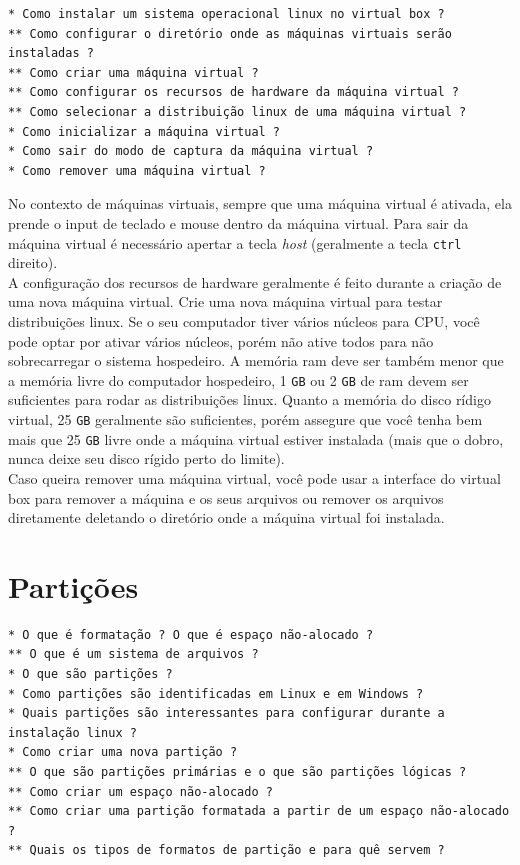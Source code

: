 \documentclass[12pt,a4paper]{article}
\begin{document}
\begin{lstlisting}
* Como instalar um sistema operacional linux no virtual box ?
** Como configurar o diretório onde as máquinas virtuais serão instaladas ?
** Como criar uma máquina virtual ?
** Como configurar os recursos de hardware da máquina virtual ? 
** Como selecionar a distribuição linux de uma máquina virtual ? 
* Como inicializar a máquina virtual ?
* Como sair do modo de captura da máquina virtual ? 
* Como remover uma máquina virtual ? 
\end{lstlisting}

\vspace{\baselineskip}

No contexto de máquinas virtuais, sempre que uma máquina virtual é ativada, ela prende o input de teclado e mouse dentro da máquina virtual. Para sair da máquina virtual é necessário apertar a tecla \textit{host} (geralmente a tecla \texttt{ctrl} direito). \\

A configuração dos recursos de hardware geralmente é feito durante a criação de uma nova máquina virtual. Crie uma nova máquina virtual para testar distribuições linux. Se o seu computador tiver vários núcleos para CPU, você pode optar por ativar vários núcleos, porém não ative todos para não sobrecarregar o sistema hospedeiro. A memória ram deve ser também menor que a memória livre do computador hospedeiro, 1 \texttt{GB} ou 2 \texttt{GB} de ram devem ser suficientes para rodar as distribuições linux. Quanto a memória do disco rídigo virtual, 25 \texttt{GB} geralmente são suficientes, porém assegure que você tenha bem mais que 25 \texttt{GB} livre onde a máquina virtual estiver instalada (mais que o dobro, nunca deixe seu disco rígido perto do limite). \\

Caso queira remover uma máquina virtual, você pode usar a interface do virtual box para remover a máquina e os seus arquivos ou remover os arquivos diretamente deletando o diretório onde a máquina virtual foi instalada.

\section*{Partições}  

\vspace{\baselineskip}

\begin{lstlisting}
* O que é formatação ? O que é espaço não-alocado ?
** O que é um sistema de arquivos ?
* O que são partições ? 
* Como partições são identificadas em Linux e em Windows ?
* Quais partições são interessantes para configurar durante a instalação linux ? 
* Como criar uma nova partição ?
** O que são partições primárias e o que são partições lógicas ? 
** Como criar um espaço não-alocado ? 
** Como criar uma partição formatada a partir de um espaço não-alocado ?
** Quais os tipos de formatos de partição e para quê servem ? 
\end{lstlisting}
\end{document}
